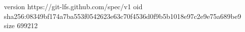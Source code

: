 version https://git-lfs.github.com/spec/v1
oid sha256:08349bf174a7ba553f0542623e63c70f4536d0f9b5b1018e97c2e9e75a689be9
size 699212
